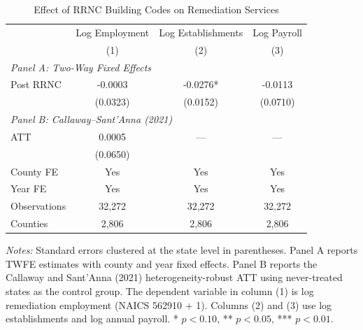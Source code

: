 \begin{table}[htbp]
\centering
\caption{Effect of RRNC Building Codes on Remediation Services}
\label{tab:main}
\begin{tabular}{lccc}
\hline\hline
 & Log Employment & Log Establishments & Log Payroll \\
 & (1) & (2) & (3) \\
\hline
\multicolumn{4}{l}{\textit{Panel A: Two-Way Fixed Effects}} \\
Post RRNC & -0.0003 & -0.0276* & -0.0113 \\
 & (0.0323) & (0.0152) & (0.0710) \\
[6pt]
\multicolumn{4}{l}{\textit{Panel B: Callaway--Sant'Anna (2021)}} \\
ATT & 0.0005 & --- & --- \\
 & (0.0650) & & \\
\hline
County FE & Yes & Yes & Yes \\
Year FE & Yes & Yes & Yes \\
Observations & 32,272 & 32,272 & 32,272 \\
Counties & 2,806 & 2,806 & 2,806 \\
\hline\hline
\end{tabular}
\begin{tablenotes}[flushleft]
\small
\item \textit{Notes:} Standard errors clustered at the state level in parentheses. Panel A reports TWFE estimates with county and year fixed effects. Panel B reports the Callaway and Sant'Anna (2021) heterogeneity-robust ATT using never-treated states as the control group. The dependent variable in column (1) is log remediation employment (NAICS 562910 + 1). Columns (2) and (3) use log establishments and log annual payroll. * $p<0.10$, ** $p<0.05$, *** $p<0.01$.
\end{tablenotes}
\end{table}

